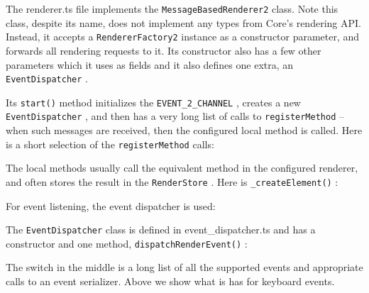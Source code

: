 The renderer.ts file implements the
\texttt{MessageBasedRenderer2}
class. Note this class,
despite its name, does not implement any types from Core’s rendering API. Instead, it
accepts a
\texttt{RendererFactory2}
instance as a constructor parameter, and forwards all
rendering requests to it. Its constructor also has a few other parameters which it uses
as fields and it also defines one extra, an
\texttt{EventDispatcher}
.



Its
\texttt{start()}
method initializes the
\texttt{EVENT\_2\_CHANNEL}
, creates a new
\texttt{EventDispatcher}
, and then has a very long list of calls to
\texttt{registerMethod}
– when
such messages are received, then the configured local method is called. Here is a
short selection of the
\texttt{registerMethod}
calls:



The local methods usually call the equivalent method in the configured renderer, and
often stores the result in the
\texttt{RenderStore}
. Here is
\texttt{\_createElement()}
:



For event listening, the event dispatcher is used:



The
\texttt{EventDispatcher}
class is defined in event\_dispatcher.ts and has a constructor
and one method,
\texttt{dispatchRenderEvent()}
:



The switch in the middle is a long list of all the supported events and appropriate calls
to an event serializer. Above we show what is has for keyboard events.
